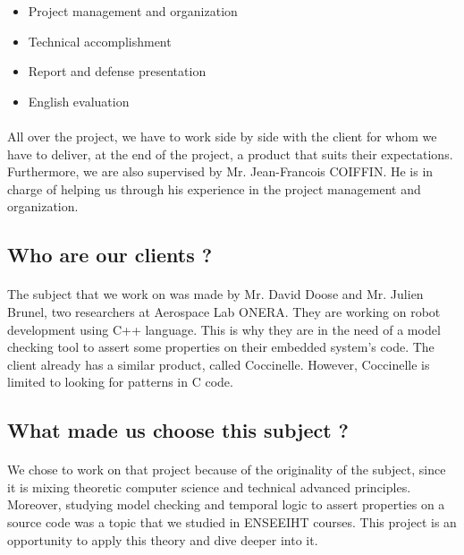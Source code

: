 \documentclass{report}
\begin{document}
\vspace{3mm}
\begin{itemize}
\item Project management and organization\vspace{1mm}
\item Technical accomplishment\vspace{1mm}
\item Report and defense presentation\vspace{1mm}
\item English evaluation\vspace{1mm}
\end{itemize}

\paragraph{}
\hspace{4mm}\textnormal{All over the project, we have to work side by side with the client
 for whom we have to deliver, at the end of the project,
 a product that suits their expectations. Furthermore, we are 
also supervised by Mr. Jean-Francois COIFFIN. He is in charge 
of helping us through his experience in the project management and 
organization.}

\subsection{Who are our clients ?}

\paragraph{}
\hspace{4mm}\textnormal{The subject that we work on was made by Mr. David Doose and
 Mr. Julien Brunel, two researchers at Aerospace Lab ONERA. They are
 working on robot development using C++ language. This is why they are
 in the need of a model checking tool to assert some properties on their 
embedded system's code. The client already has a similar product, called Coccinelle. 
However, Coccinelle is limited to looking for patterns in C code.}

\subsection{What made us choose this subject ?}

\paragraph{}
\hspace{4mm}\textnormal{We chose to work on that project because of the originality of the subject, since it is mixing theoretic computer science and technical advanced principles.
       Moreover, studying model checking and temporal logic to assert properties on a source code was a topic that we studied in ENSEEIHT courses. This project is an opportunity to apply this theory and dive deeper into it.}
\end{document}
